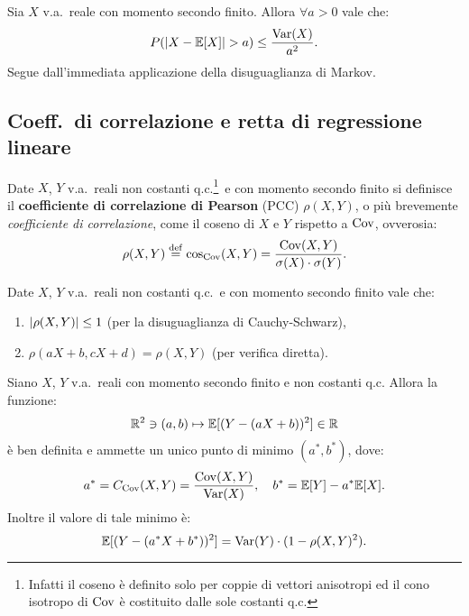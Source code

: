\begin{multicols*}{2}
\begin{proposition}
    Sia $X$ v.a.~reale con momento secondo finito. Allora $\forall a > 0$ vale
    che:
    \[
        P(\left\lvert X - \mathbb{E}[X] \right\rvert > a) \leq \frac{\operatorname{Var}(X)}{a^2}.
    \]
    Segue dall'immediata applicazione della disuguaglianza di Markov.
\end{proposition}

\subsection{Coeff.~di correlazione e retta di regressione lineare}

\begin{definition}
    Date $X$, $Y$ v.a.~reali non costanti q.c.\footnote{
        Infatti il coseno è definito solo per coppie di vettori anisotropi
        ed il cono isotropo di $\operatorname{Cov}$ è costituito dalle sole costanti q.c.
    }~e con momento secondo finito si definisce il \textbf{coefficiente di correlazione
    di Pearson} (PCC) $\rho(X, Y)$, o più brevemente \textit{coefficiente di correlazione}, 
     come il coseno di $X$ e $Y$ rispetto a $\operatorname{Cov}$, ovverosia:
    \[
        \rho(X, Y) \overset{\mathrm{def}}{=} \cos_{\operatorname{Cov}}(X, Y) = \frac{\operatorname{Cov}(X, Y)}{\sigma(X) \cdot \sigma(Y)}.
    \]
\end{definition}

\begin{lemma}
    Date $X$, $Y$ v.a.~reali non costanti q.c.~e con momento secondo finito vale che:
    \begin{enumerate}[(i.)]
        \item $\left\lvert \rho(X, Y) \right\rvert \leq 1$ (per la disuguaglianza di Cauchy-Schwarz),
        \item $\rho(aX + b, cX + d) = \rho(X, Y)$ (per verifica diretta).
    \end{enumerate}
\end{lemma}

\begin{theorem}
    Siano $X$, $Y$ v.a.~reali con momento secondo finito e non costanti q.c. Allora
    la funzione:
    \[
        \mathbb{R}^2 \ni (a, b) \mapsto \mathbb{E}[(Y - (aX + b))^2] \in \mathbb{R}
    \]
    è ben definita e ammette un unico punto di minimo $(a^*, b^*)$, dove:
    \[
        a^* = C_{\operatorname{Cov}}(X, Y) = \frac{\operatorname{Cov}(X, Y)}{\operatorname{Var}(X)}, \quad b^* = \mathbb{E}[Y] - a^* \mathbb{E}[X].
    \]
    Inoltre il valore di tale minimo è:
    \[
        \mathbb{E}[(Y - (a^* X + b^*))^2] = \operatorname{Var}(Y) \cdot (1 - \rho(X, Y)^2).
    \]
\end{theorem}


\end{multicols*}
